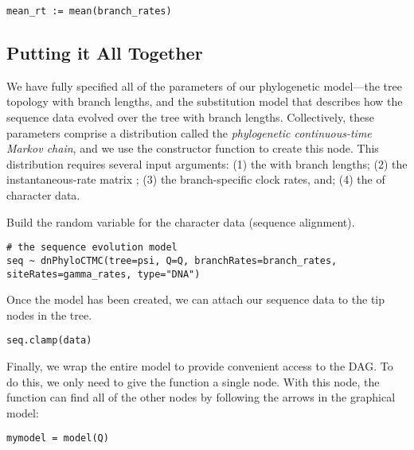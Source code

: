 {\tt \begin{snugshade*}
\begin{lstlisting}
mean_rt := mean(branch_rates)
\end{lstlisting}
\end{snugshade*}}



\subsection{Putting it All Together}

We have fully specified all of the parameters of our phylogenetic model---the tree topology with branch lengths, and the substitution model that describes how the sequence data evolved over the tree with branch lengths.  
Collectively, these parameters comprise a distribution called the \textit{phylogenetic continuous-time Markov chain}, and we use the  constructor function to create this node.
This distribution requires several input arguments: 
(1) the  with branch lengths; 
(2) the instantaneous-rate matrix ;
(3) the branch-specific clock rates, and; 
(4) the  of character data.


Build the random variable for the character data (sequence alignment).
{\tt \begin{snugshade*}
\begin{lstlisting}
# the sequence evolution model
seq ~ dnPhyloCTMC(tree=psi, Q=Q, branchRates=branch_rates, siteRates=gamma_rates, type="DNA")
\end{lstlisting}
\end{snugshade*}}


Once the  model has been created, we can attach our sequence data to the tip nodes in the tree.
{\tt \begin{snugshade*}
\begin{lstlisting}
seq.clamp(data)
\end{lstlisting}
\end{snugshade*}}
Finally, we wrap the entire model to provide convenient access to the DAG. 
To do this, we only need to give the  function a single node. 
With this node, the  function can find all of the other nodes by following the arrows in the graphical model:
{\tt \begin{snugshade*}
\begin{lstlisting}
mymodel = model(Q)
\end{lstlisting}
\end{snugshade*}}

